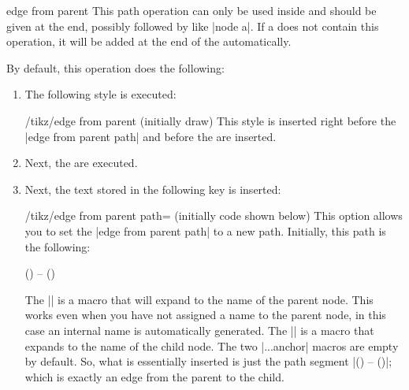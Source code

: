 \begin{pathoperation}{edge from parent}{}
    This path operation can only be used inside  and should
    be given at the end, possibly followed by  like
    |node {a}|. If a  does not contain this operation, it will
    be added at the end of the  automatically.

    By default, this operation does the following:
    \begin{enumerate}
        \item The following style is executed:
            \begin{stylekey}{/tikz/edge from parent (initially draw)}
                This style is inserted right before the |edge from parent path|
                and before the  are inserted.
\begin{codeexample}[]
\end{codeexample}
            \end{stylekey}
        \item Next, the  are executed.
        \item Next, the text stored in the following key is inserted:
            \begin{key}{/tikz/edge from parent path= (initially \normalfont code shown below)}
                This option allows you to set the |edge from parent path| to a
                new path. Initially, this path is the following:
\begin{codeexample}
(\tikzparentnode\tikzparentanchor) -- (\tikzchildnode\tikzchildanchor)
\end{codeexample}
                The |\tikzparentnode| is a macro that will expand to the name
                of the parent node. This works even when you have not assigned
                a name to the parent node, in this case an internal name is
                automatically generated. The |\tikzchildnode| is a macro that
                expands to the name of the child node. The two |...anchor|
                macros are empty by default. So, what is essentially inserted
                is just the path segment
                |(\tikzparentnode) -- (\tikzchildnode)|; which is exactly an
                edge from the parent to the child.


\end{key}
\end{enumerate}
\end{pathoperation}
